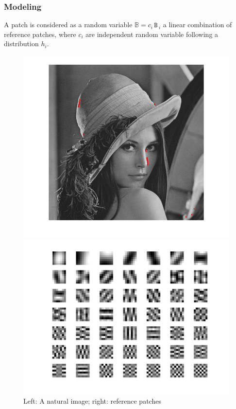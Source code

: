 \documentclass[compress]{beamer} %
\newcommand{\mat}[1]{\ensuremath{\,\mathtt{#1}\,}}
\begin{document}
 \begin{frame}
  \frametitle{Modeling}
  A patch is considered as a random variable $\mathbb{B}=c_i \mat{B}_i$ a linear combination of reference patches, where $c_i$ are independent random variable following a distribution $h_i$.
	\begin{figure}[h!]
	\centering
	\begin{minipage}{0.4\linewidth}
	\includegraphics[width=\linewidth]{lena}
	  
	\end{minipage}
	\begin{minipage}{0.4\linewidth}
	\includegraphics[width=\linewidth]{princomp_lena.png}
    
	\end{minipage}
	    \caption{Left: A natural image; right: reference patches}
	
	\end{figure}      
 \end{frame}
\end{document}

